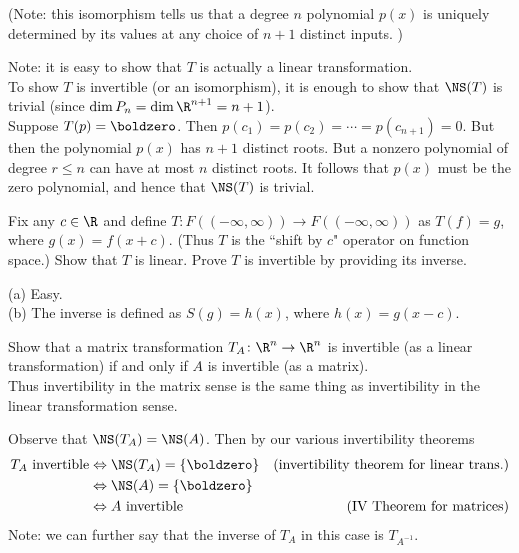 (Note: this isomorphism tells us that a degree $n$ polynomial $p(x)$ is uniquely determined by its values at any choice of $n+1$ distinct inputs. )
\\
\begin{solution}
\noindent Note: it is easy to show that $T$ is actually a linear transformation. 
\\
To show $T$ is invertible (or an isomorphism), it is enough to show that $\NS(T)$ is trivial (since $\dim P_n=\dim\R^{n+1}=n+1$). 
\\
Suppose $T(p)=\boldzero$. Then $p(c_1)=p(c_2)=\cdots =p(c_{n+1})=0$. But then the polynomial $p(x)$ has $n+1$ distinct roots. But a nonzero polynomial of degree $r\leq n$ can have at most $n$ distinct roots. It follows that $p(x)$ must be the zero polynomial, and hence that $\NS(T)$ is trivial. 
\end{solution}
\ii Fix any $c\in\R$ and define $T\colon F((-\infty, \infty))\rightarrow F((-\infty, \infty))$ as $T(f)=g$, where $g(x)=f(x+c)$. (Thus $T$ is the ``shift by $c$" operator on function space.)  
\bb
\ii Show that $T$ is linear. 
\ii Prove $T$ is invertible by providing its inverse. 
\ee
\begin{solution}
\noindent 
(a) Easy. 
\\
(b) The inverse is defined as $S(g)=h(x)$, where $h(x)=g(x-c)$. 
\end{solution}
\ii Show that a matrix transformation $T_A\colon\R^n\rightarrow \R^n$ is invertible (as a linear transformation) if and only if $A$ is invertible (as a matrix). 
\\
Thus invertibility in the matrix sense is the same thing as invertibility in the linear transformation sense. 
\\
\begin{solution}
\noindent
Observe that $\NS(T_A)=\NS(A)$. Then by our various invertibility theorems
\begin{align*}
T_A \text{ invertible}&\Leftrightarrow \NS(T_A)=\{\boldzero\} &\text{(invertibility theorem for linear trans.)}\\
&\Leftrightarrow \NS(A)=\{\boldzero\} \\
&\Leftrightarrow A \text{ invertible} &\text{(IV Theorem for matrices)}
\end{align*}
Note: we can further say that the inverse of $T_A$ in this case is $T_{A^{-1}}$.
\end{solution}
